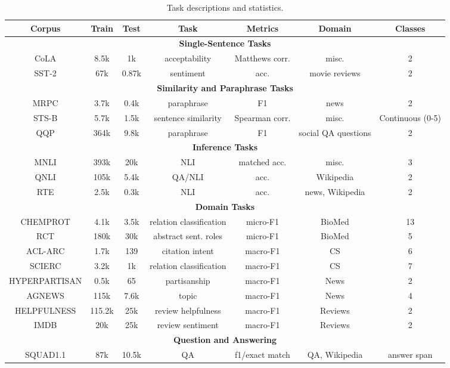 \documentclass[10pt,twocolumn,letterpaper]{article}
\begin{document}
\begin{table*}[ht]
\centering
\small %
\label{tab:task-descriptions}
\begin{tabular}{@{}ccccccc@{}}
\toprule
\hline
\textbf{Corpus} & \textbf{Train} & \textbf{Test} & \textbf{Task} & \textbf{Metrics} & \textbf{Domain} & \textbf{Classes} \\ \hline
\multicolumn{7}{c}{\textbf{Single-Sentence Tasks}} \\ \hline
CoLA & 8.5k & 1k & acceptability & Matthews corr. & misc. & 2 \\
SST-2 & 67k & 0.87k & sentiment & acc. & movie reviews & 2 \\ \hline
\multicolumn{7}{c}{\textbf{Similarity and Paraphrase Tasks}} \\ \hline
MRPC & 3.7k & 0.4k & paraphrase & F1 & news & 2 \\
STS-B & 5.7k & 1.5k & sentence similarity & Spearman corr. & misc. & Continuous (0-5) \\
QQP & 364k & 9.8k & paraphrase & F1 & social QA questions & 2 \\ \hline
\multicolumn{7}{c}{\textbf{Inference Tasks}} \\ \hline
MNLI & 393k & 20k & NLI & matched acc. & misc. & 3 \\
QNLI & 105k & 5.4k & QA/NLI & acc. & Wikipedia & 2 \\
RTE & 2.5k & 0.3k & NLI & acc. & news, Wikipedia & 2 \\ \hline
\multicolumn{7}{c}{\textbf{Domain Tasks}} \\ \hline
CHEMPROT & 4.1k & 3.5k & relation classification & micro-F1 & BioMed & 13 \\
RCT & 180k & 30k & abstract sent. roles & micro-F1 & BioMed & 5 \\
ACL-ARC & 1.7k & 139 & citation intent & macro-F1 & CS & 6 \\
SCIERC & 3.2k & 1k & relation classification & macro-F1 & CS & 7 \\
HYPERPARTISAN & 0.5k & 65 & partisanship & macro-F1 & News & 2 \\
AGNEWS & 115k & 7.6k & topic & macro-F1 & News & 4 \\
HELPFULNESS & 115.2k & 25k & review helpfulness & macro-F1 & Reviews & 2 \\
IMDB & 20k & 25k & review sentiment & macro-F1 & Reviews & 2 \\ \hline
\multicolumn{7}{c}{\textbf{Question and Answering}} \\ \hline
SQUAD1.1 & 87k & 10.5k & QA & f1/exact match & QA, Wikipedia & answer span \\
\bottomrule
\end{tabular}

\caption{Task descriptions and statistics.}
\label{tab:table1}
\end{table*}
\end{document}
